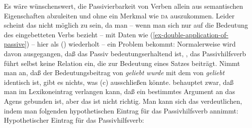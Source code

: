 {%


Es wäre wünschenswert, die Passivierbarkeit von Verben allein aus semantischen Eigenschaften abzuleiten
und ohne ein Merkmal wie \textsc{da} auszukommen. Leider scheint das nicht möglich zu sein, 
da man -- wenn man sich nur auf die Bedeutung des eingebetteten
Verbs bezieht -- mit Daten wie (\ref{ex-double-application-of-passive}) -- hier als () wiederholt --
ein Problem bekommt: Normalerweise wird davon ausgegangen, daß das Passiv bedeutungserhaltend ist, 
\dash, das Passivhilfsverb führt selbst keine Relation ein, die zur Bedeutung eines Satzes beiträgt. 
\eal
\label{ex-double-application-of-passive-zwei}
\zl
Nimmt man an, daß der Bedeutungsbeitrag von \emph{geliebt wurde} mit dem von \emph{geliebt} identisch ist,
gibt es nichts, was (c) ausschließen könnte. \citet[]{Gunkel2003b} behauptet zwar, 
daß man im Lexikoneintrag verlangen kann, daß ein bestimmtes Argument an das Agens gebunden ist, aber
das ist nicht richtig. Man kann sich das verdeutlichen, indem man folgenden hypothetischen
Eintrag für das Passivhilfsverb annimmt:
\eas
\label{le-passiv-gunkel}
Hypothetischer Eintrag für das Passivhilfsverb:\\
}
